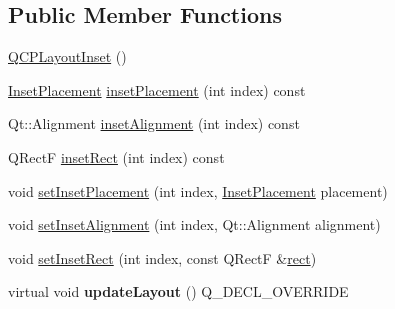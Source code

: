 \subsection*{Public Member Functions}
\begin{DoxyCompactItemize}
\item 
\hyperlink{classQCPLayoutInset_a3ad984f3221735374cc5dee14356a7dd}{Q\+C\+P\+Layout\+Inset} ()
\item 
\hyperlink{classQCPLayoutInset_a8b9e17d9a2768293d2a7d72f5e298192}{Inset\+Placement} \hyperlink{classQCPLayoutInset_a8472ff2508807513e4cb0ce0c1d652b3}{inset\+Placement} (int index) const 
\item 
Qt\+::\+Alignment \hyperlink{classQCPLayoutInset_a78c0c494bb5728237cebb63ae8ef5c58}{inset\+Alignment} (int index) const 
\item 
Q\+RectF \hyperlink{classQCPLayoutInset_a5ec7037b3b8d20fbf9560e01779b1442}{inset\+Rect} (int index) const 
\item 
void \hyperlink{classQCPLayoutInset_a63298830744d5d8c5345511c00fd2144}{set\+Inset\+Placement} (int index, \hyperlink{classQCPLayoutInset_a8b9e17d9a2768293d2a7d72f5e298192}{Inset\+Placement} placement)
\item 
void \hyperlink{classQCPLayoutInset_a62882a4f9ad58bb0f53da12fde022abe}{set\+Inset\+Alignment} (int index, Qt\+::\+Alignment alignment)
\item 
void \hyperlink{classQCPLayoutInset_aa487c8378a6f9533567a2e6430099dc3}{set\+Inset\+Rect} (int index, const Q\+RectF \&\hyperlink{classQCPLayoutElement_affdfea003469aac3d0fac5f4e06171bc}{rect})
\item 
virtual void {\bfseries update\+Layout} () Q\+\_\+\+D\+E\+C\+L\+\_\+\+O\+V\+E\+R\+R\+I\+DE\hypertarget{classQCPLayoutInset_a493526b922ea66a75c45ef1842446988}{}\label{classQCPLayoutInset_a493526b922ea66a75c45ef1842446988}


\end{DoxyCompactItemize}
